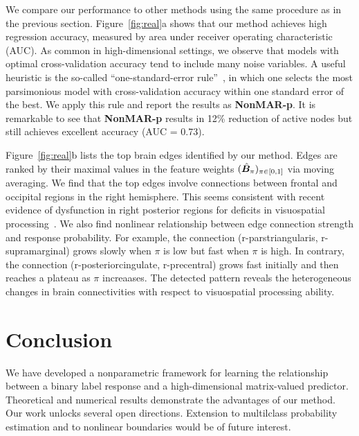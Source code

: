 \documentclass[11pt]{article}
\theoremstyle{definition}
\begin{document}
We compare our performance to other methods using the same procedure as in the previous section. Figure~\ref{fig:real}a shows that our method achieves high regression accuracy, measured by area under receiver operating characteristic (AUC). As common in high-dimensional settings, we observe that models with optimal cross-validation accuracy tend to include many noise variables. A useful heuristic is the so-called ``one-standard-error rule''~\citep{hastie2015statistical}, in which one selects the most parsimonious model with cross-validation accuracy within one standard error of the best. We apply this rule and report the results as {\bf \small NonMAR-p}. It is remarkable to see that {\bf \small NonMAR-p} results in 12\% reduction of active nodes but still achieves excellent accuracy (AUC = 0.73). 



Figure~\ref{fig:real}b lists the top brain edges identified by our method. Edges are ranked by their maximal values in the feature weights $(\hat {\bm B}_\pi)_{\pi \in [0,1]}$ via moving averaging. We find that the top edges involve connections between frontal and occipital regions in the right hemisphere. This seems consistent with recent evidence of dysfunction in right posterior regions for deficits in visuospatial processing~\citep{wang2019common}. We also find nonlinear relationship between edge connection strength and response probability. For example, the connection (r-parstriangularis, r-supramarginal) grows slowly when $\pi$ is low but fast when $\pi$ is high. In contrary, the connection (r-posteriorcingulate, r-precentral) grows fast initially and then reaches a plateau as $\pi$ increaases. The detected pattern reveals the heterogeneous changes in brain connectivities with respect to visuospatial processing ability. 

\vspace{-.3cm}
\section{Conclusion}
\vspace{-.5cm}
We have developed a nonparametric framework for learning the relationship between a binary label response and a high-dimensional matrix-valued predictor. 
Theoretical and numerical results demonstrate the advantages of our method. Our work unlocks several open directions. Extension to multilclass probability estimation and to nonlinear boundaries would be of future interest. 

\singlespacing



\end{document}
